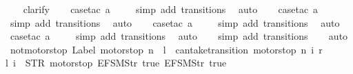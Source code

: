 \begin{isabellebody}
\ \ \isamarkupfalse%
\ clarify\isanewline
\ \ \isamarkupfalse%
\ {\isacharparenleft}case{\isacharunderscore}tac\ {\isachardoublequoteopen}a{\isacharequal}{}{\isachardoublequoteclose}{\isacharparenright}\isanewline
\ \ \ \isamarkupfalse%
\ {\isacharparenleft}simp\ add{\isacharcolon}\ transitions{\isacharparenright}\ \isamarkupfalse%
\ auto{\isacharbrackleft}{}{\isacharbrackright}\isanewline
\ \ \isamarkupfalse%
\ {\isacharparenleft}case{\isacharunderscore}tac\ {\isachardoublequoteopen}a{\isacharequal}{}{\isachardoublequoteclose}{\isacharparenright}\isanewline
\ \ \ \isamarkupfalse%
\ {\isacharparenleft}simp\ add{\isacharcolon}\ transitions{\isacharparenright}\ \isamarkupfalse%
\ auto{\isacharbrackleft}{}{\isacharbrackright}\isanewline
\ \ \isamarkupfalse%
\ {\isacharparenleft}case{\isacharunderscore}tac\ {\isachardoublequoteopen}a{\isacharequal}{}{\isachardoublequoteclose}{\isacharparenright}\isanewline
\ \ \ \isamarkupfalse%
\ {\isacharparenleft}simp\ add{\isacharcolon}\ transitions{\isacharparenright}\ \isamarkupfalse%
\ auto{\isacharbrackleft}{}{\isacharbrackright}\isanewline
\ \ \isamarkupfalse%
\ {\isacharparenleft}case{\isacharunderscore}tac\ {\isachardoublequoteopen}a{\isacharequal}{}{\isachardoublequoteclose}{\isacharparenright}\isanewline
\ \ \ \isamarkupfalse%
\ {\isacharparenleft}simp\ add{\isacharcolon}\ transitions{\isacharparenright}\ \isamarkupfalse%
\ auto{\isacharbrackleft}{}{\isacharbrackright}\isanewline
\ \ \isamarkupfalse%
\ {\isacharparenleft}simp\ add{\isacharcolon}\ transitions{\isacharparenright}\isanewline
\ \ \isamarkupfalse%
\ auto%
\endisatagproof
{\isafoldproof}%
%
\isadelimproof
\isanewline
%
\endisadelimproof
\isanewline
{}\isamarkupfalse%
\ not{\isacharunderscore}motorstop{\isacharcolon}\ {\isachardoublequoteopen}Label\ {\isacharparenleft}motorstop\ n{\isacharparenright}\ {\isacharequal}\ l\ {\isasymand}\ can{\isacharunderscore}take{\isacharunderscore}transition\ {\isacharparenleft}motorstop\ n{\isacharparenright}\ i\ r\ {\isasymLongrightarrow}\isanewline
{\isacharparenleft}l{\isacharcomma}\ i{\isacharparenright}\ {\isacharequal}\ {\isacharparenleft}STR\ {\isacharprime}{\isacharprime}motorstop{\isacharprime}{\isacharprime}{\isacharcomma}\ {\isacharbrackleft}EFSM{\isachardot}Str\ {\isacharprime}{\isacharprime}true{\isacharprime}{\isacharprime}{\isacharcomma}\ EFSM{\isachardot}Str\ {\isacharprime}{\isacharprime}true{\isacharprime}{\isacharprime}{\isacharbrackright}{\isacharparenright}{\isachardoublequoteclose}\isanewline

\end{isabellebody}
